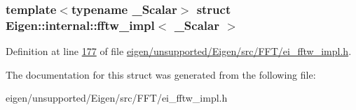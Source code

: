 \subsubsection*{template$<$typename \+\_\+\+Scalar$>$\newline
struct Eigen\+::internal\+::fftw\+\_\+impl$<$ \+\_\+\+Scalar $>$}



Definition at line \hyperlink{eigen_2unsupported_2_eigen_2src_2_f_f_t_2ei__fftw__impl_8h_source_l00177}{177} of file \hyperlink{eigen_2unsupported_2_eigen_2src_2_f_f_t_2ei__fftw__impl_8h_source}{eigen/unsupported/\+Eigen/src/\+F\+F\+T/ei\+\_\+fftw\+\_\+impl.\+h}.



The documentation for this struct was generated from the following file\+:\begin{DoxyCompactItemize}
\item 
eigen/unsupported/\+Eigen/src/\+F\+F\+T/ei\+\_\+fftw\+\_\+impl.\+h\end{DoxyCompactItemize}
